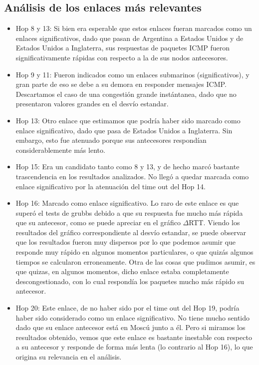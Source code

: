 \subsection{An\'alisis de los enlaces m\'as relevantes}
\begin{itemize}
\item Hop 8 y 13: Si bien era esperable que estos enlaces fueran marcados como un enlaces significativos, dado que pasan de Argentina a Estados Unidos y de Estados Unidos a Inglaterra, sus respuestas de paquetes ICMP fueron significativamente r\'apidas con respecto a la de sus nodos antecesores.
\item Hop 9 y 11: Fueron indicados como un enlaces submarinos (significativos), y gran parte de eso se debe a su demora en responder mensajes ICMP. Descartamos el caso de una congesti\'on grande inst\'antanea, dado que no presentaron valores grandes en el desv\'io estandar.
\item Hop 13: Otro enlace que estimamos que podr\'ia haber sido marcado como enlace significativo, dado que pasa de Estados Unidos a Inglaterra. Sin embargo, esto fue atenuado porque sus antecesores respond\'ian considerablemente m\'as lento.
\item Hop 15: Era un candidato tanto como 8 y 13, y de hecho marc\'o bastante trascendencia en los resultados analizados. No lleg\'o a quedar marcada como enlace significativo por la atenuaci\'on del time out del Hop 14.
\item Hop 16: Marcado como enlace significativo. Lo raro de este enlace es que super\'o el tests de grubbs debido a que su respuesta fue mucho m\'as r\'apida que su antecesor, como se puede apreciar en el gr\'afico $\Delta$RTT. Viendo los resultados del gr\'afico correspondiente al desv\'io estandar, se puede observar que los resultados fueron muy dispersos por lo que podemos asumir que responde muy r\'apido en algunos momentos particulares, o que quiz\'as algunos tiempos se calcularon erroneamente. Otra de las cosas que pudimos asumir, es que quizas, en algunos momentos, dicho enlace estaba completamente descongestionado, con lo cual respond\'ia los paquetes mucho m\'as r\'apido su antecesor. 
\item Hop 20: Este enlace, de no haber sido por el time out del Hop 19, podr\'ia haber sido considerado como un enlace significativo. No tiene mucho sentido dado que su enlace antecesor est\'a en Mosc\'u junto a \'el. Pero si miramos los resultados obtenido, vemos que este enlace es bastante inestable con respecto a su antecesor y responde de forma m\'as lenta (lo contrario al Hop 16), lo que origina su relevancia en el an\'alisis.
\end{itemize}


